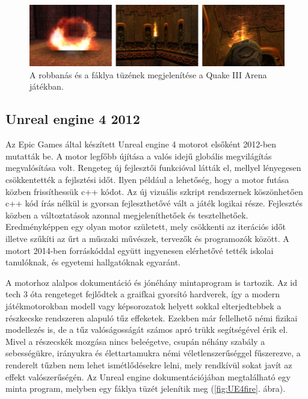 \begin{figure}[h]
 \includegraphics[width=\textwidth]{kepek/quake3fire.png}
 \caption{A robbanás és a fáklya tüzének megjelenítése a Quake III Arena játékban.}
 \label{fig:quake3fire}
\end{figure}



\subsection{Unreal engine 4 2012}
Az Epic Games által készített Unreal engine 4 motorot elsőként 2012-ben mutatták be. A motor legfőbb újítása a valós idejű globális megvilágítás megvalósítása volt. Rengeteg új fejlesztői funkcióval látták el, mellyel lényegesen csökkentették a fejlsztési időt. Ilyen például a lehetőség, hogy a motor futása közben frissíthessük c++ kódot. Az új vizuális szkript rendszernek köszönhetően c++ kód írás nélkül is gyorsan fejleszthetővé vált a játék logikai része. Fejlesztés közben a változtatások azonnal megjeleníthetőek és tesztelhetőek. Eredményképpen egy olyan motor született, mely csökkenti az iterációs időt illetve szűkíti az űrt a műszaki művészek, tervezők és programozók között. A motort 2014-ben forráskóddal együtt ingyenesen elérhetővé tették iskolai tanulóknak, és egyetemi hallgatóknak egyaránt. \cite{wikUE4}

A motorhoz alalpos dokumentáció és jónéhány mintaprogram is tartozik. Az id tech 3 óta rengeteget fejlődtek a graifkai gyorsító hardverek, így a modern játékmotorokban modell vagy képsorozatok helyett sokkal elterjedtebbek a részkecske rendszeren alapuló tűz effeketek. Ezekben már fellelhető némi fizikai modellezés is, de a tűz valóságosságát számos apró trükk segítségével érik el. Mivel a részecskék mozgása nincs beleégetve, csupán néhány szabály a sebességükre, irányukra és élettartamukra némi véletlenszerűséggel fűszerezve, a renderelt tűzben nem lehet ismétlődésekre lelni, mely rendkívül sokat javít az effekt valószerűségén. Az Unreal engine dokumentációjában megtalálható egy minta program, melyben egy fáklya tüzét jelenítik meg (\ref{fig:UE4fire}. ábra).

